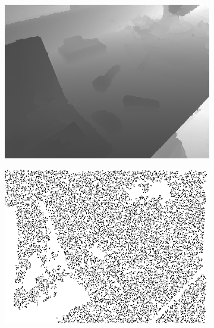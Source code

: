 \documentclass[preprint,10pt,5p,times,twocolumn]{elsarticle}
\begin{document}
\begin{figure}[t]
\begin{center}
\begin{subfigure}[b]{0.136\linewidth}
    \includegraphics[width=\linewidth]{desk_structure_missing_inpainting.png}
\end{subfigure}
\begin{subfigure}[b]{0.136\linewidth}
    \includegraphics[width=\linewidth]{desk_random_missing_depth.png}
\end{subfigure}
\begin{subfigure}[b]{0.136\linewidth}

\end{subfigure}
\end{center}
\end{figure}
\end{document}
